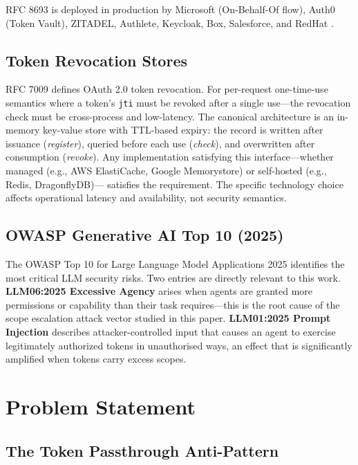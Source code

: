 \documentclass[journal]{IEEEtran}
\begin{document}
RFC 8693 is deployed in production by Microsoft (On-Behalf-Of flow), Auth0
(Token Vault), ZITADEL, Authlete, Keycloak, Box, Salesforce, and
RedHat \cite{rfc8693_deploy}.

\subsection{Token Revocation Stores}

RFC 7009 \cite{rfc7009} defines OAuth 2.0 token revocation. For per-request
one-time-use semantics where a token's \texttt{jti} must be revoked after a
single use---the revocation check must be cross-process and low-latency. The
canonical architecture is an in-memory key-value store with TTL-based expiry:
the record is written after issuance (\textit{register}), queried before each
use (\textit{check}), and overwritten after consumption (\textit{revoke}). Any
implementation satisfying this interface---whether managed (e.g., AWS
ElastiCache, Google Memorystore) or self-hosted (e.g., Redis, DragonflyDB)---
satisfies the requirement. The specific technology choice affects operational
latency and availability, not security semantics.

\subsection{OWASP Generative AI Top 10 (2025)}

The OWASP Top 10 for Large Language Model Applications 2025 \cite{owasp_genai}
identifies the most critical LLM security risks. Two entries are directly
relevant to this work. \textbf{LLM06:2025 Excessive Agency} arises when agents
are granted more permissions or capability than their task requires---this is the
root cause of the scope escalation attack vector studied in this paper.
\textbf{LLM01:2025 Prompt Injection} describes attacker-controlled input that
causes an agent to exercise legitimately authorized tokens in unauthorised ways,
an effect that is significantly amplified when tokens carry excess scopes.


\section{Problem Statement}
\label{sec:problem}

\subsection{The Token Passthrough Anti-Pattern}
\end{document}
